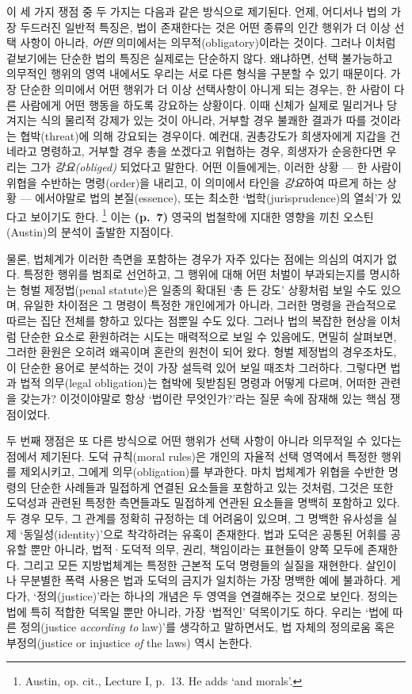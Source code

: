 \documentclass[12pt, oneside]{book}  %
\begin{document}
이 세 가지 쟁점 중 두 가지는 다음과 같은 방식으로 제기된다. 언제,
어디서나 법의 가장 두드러진 일반적 특징은, 법이 존재한다는 것은 어떤
종류의 인간 행위가 더 이상 선택 사항이 아니라, \emph{어떤} 의미에서는
의무적(obligatory)이라는 것이다. 그러나 이처럼 겉보기에는 단순한 법의
특징은 실제로는 단순하지 않다. 왜냐하면, 선택 불가능하고 의무적인 행위의
영역 내에서도 우리는 서로 다른 형식을 구분할 수 있기 때문이다. 가장
단순한 의미에서 어떤 행위가 더 이상 선택사항이 아니게 되는 경우는, 한
사람이 다른 사람에게 어떤 행동을 하도록 강요하는 상황이다. 이때 신체가
실제로 밀리거나 당겨지는 식의 물리적 강제가 있는 것이 아니라, 거부할
경우 불쾌한 결과가 따를 것이라는 협박(threat)에 의해 강요되는 경우이다.
예컨대, 권총강도가 희생자에게 지갑을 건네라고 명령하고, 거부할 경우
총을 쏘겠다고 위협하는 경우, 희생자가 순응한다면 우리는 그가
\emph{강요(obliged)} 되었다고 말한다. 어떤 이들에게는, 이러한 상황 ---
한 사람이 위협을 수반하는 명령(order)을 내리고, 이 의미에서 타인을
\emph{강요}하여 따르게 하는 상황 --- 에서야말로 법의 본질(essence), 또는
최소한 `법학(jurisprudence)의 열쇠'가 있다고 보이기도 한다. \footnote{Austin,
  op. cit., Lecture I, p.~13. He adds `and morals'.} 이는
\textbf{(p.~7)} 영국의 법철학에 지대한 영향을 끼친 오스틴(Austin)의
분석이 출발한 지점이다.

물론, 법체계가 이러한 측면을 포함하는 경우가 자주 있다는 점에는 의심의
여지가 없다. 특정한 행위를 범죄로 선언하고, 그 행위에 대해 어떤 처벌이
부과되는지를 명시하는 형벌 제정법(penal statute)은 일종의 확대된 `총 든
강도' 상황처럼 보일 수도 있으며, 유일한 차이점은 그 명령이 특정한
개인에게가 아니라, 그러한 명령을 관습적으로 따르는 집단 전체를 향하고
있다는 점뿐일 수도 있다. 그러나 법의 복잡한 현상을 이처럼 단순한 요소로
환원하려는 시도는 매력적으로 보일 수 있음에도, 면밀히 살펴보면, 그러한
환원은 오히려 왜곡이며 혼란의 원천이 되어 왔다. 형벌 제정법의
경우조차도, 이 단순한 용어로 분석하는 것이 가장 설득력 있어 보일 때조차
그러하다. 그렇다면 법과 법적 의무(legal obligation)는 협박에 뒷받침된
명령과 어떻게 다르며, 어떠한 관련을 갖는가? 이것이야말로 항상 `법이란
무엇인가?'라는 질문 속에 잠재해 있는 핵심 쟁점이었다.

두 번째 쟁점은 또 다른 방식으로 어떤 행위가 선택 사항이 아니라 의무적일
수 있다는 점에서 제기된다. 도덕 규칙(moral rules)은 개인의 자율적 선택
영역에서 특정한 행위를 제외시키고, 그에게 의무(obligation)를 부과한다.
마치 법체계가 위협을 수반한 명령의 단순한 사례들과 밀접하게 연결된
요소들을 포함하고 있는 것처럼, 그것은 또한 도덕성과 관련된 특정한
측면들과도 밀접하게 연관된 요소들을 명백히 포함하고 있다. 두 경우 모두,
그 관계를 정확히 규정하는 데 어려움이 있으며, 그 명백한 유사성을 실제
`동일성(identity)'으로 착각하려는 유혹이 존재한다. 법과 도덕은 공통된
어휘를 공유할 뿐만 아니라, 법적·도덕적 의무, 권리, 책임이라는 표현들이
양쪽 모두에 존재한다. 그리고 모든 지방법체계는 특정한 근본적 도덕
명령들의 실질을 재현한다. 살인이나 무분별한 폭력 사용은 법과 도덕의
금지가 일치하는 가장 명백한 예에 불과하다. 게다가, `정의(justice)'라는
하나의 개념은 두 영역을 연결해주는 것으로 보인다. 정의는 법에 특히
적합한 덕목일 뿐만 아니라, 가장 `법적인' 덕목이기도 하다. 우리는 `법에
따른 정의(justice \emph{according to} law)'를 생각하고 말하면서도, 법
자체의 정의로움 혹은 부정의(justice or injustice \emph{of} the laws)
역시 논한다.
\end{document}
